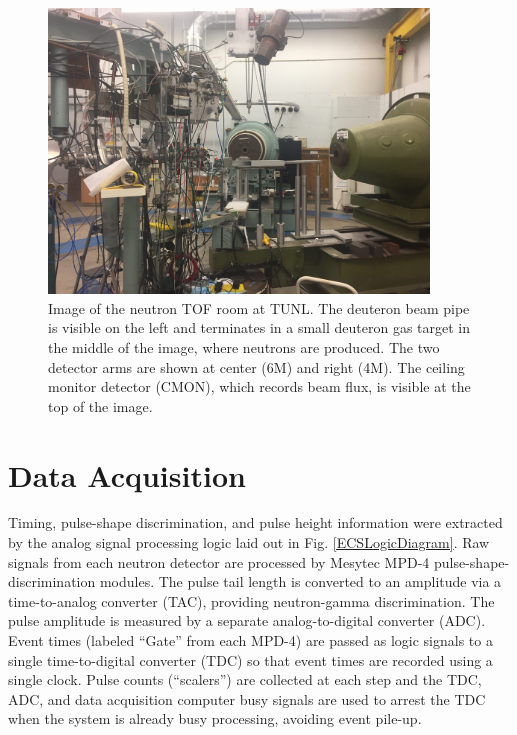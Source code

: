 \begin{figure}[tb]
    \centering
    \includegraphics[width = 0.9\textwidth]{figures/TOFRoomPhoto.jpg}
    \caption[Image of the neutron TOF room at TUNL] 
    {
    Image of the neutron TOF room at TUNL. The deuteron beam pipe is visible on the left and
    terminates in a small deuteron gas target in the middle of the image, where neutrons are
    produced. The two detector arms are shown at center (6M) and right (4M). The ceiling
    monitor detector (CMON), which records beam flux, is visible at the top of the image.
    }
    \label{TOFRoomPhoto}
\end{figure}

\section{Data Acquisition}
Timing, pulse-shape discrimination, and pulse height information were
extracted by the analog signal processing logic laid out in Fig. \ref{ECSLogicDiagram}.
Raw signals from each neutron detector are processed by Mesytec MPD-4
pulse-shape-discrimination modules. The pulse tail length is converted to an
amplitude via a time-to-analog converter (TAC), providing neutron-gamma
discrimination. The pulse amplitude is measured by a separate
analog-to-digital converter (\gls{ADC}). Event times (labeled ``Gate'' from each MPD-4)
are passed as logic signals to a single time-to-digital converter (\gls{TDC}) so that
event times are recorded using a single clock. Pulse counts (``scalers'') are
collected at each step and the TDC, ADC, and data acquisition computer busy
signals are used to arrest the TDC when the system is already busy processing,
avoiding event pile-up.


